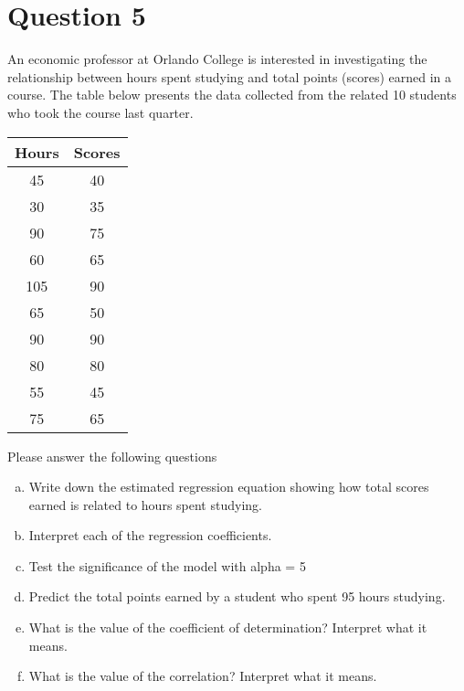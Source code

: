 \documentclass[
	11pt, %
]{assignment}
\begin{document}
\section*{Question 5}
\begin{problem}
An economic professor at Orlando College is interested in investigating the relationship between hours spent studying and total points (scores) earned in a course. The table below presents the data collected from the related 10 students who took the course last quarter.

\medskip

\begin{center}
	\begin{tabular}{c c}
		\toprule
		\textbf{Hours} & \textbf{Scores} \\
		\midrule
		45             & 40              \\
		30             & 35              \\
		90             & 75              \\
		60             & 65              \\
		105            & 90              \\
		65             & 50              \\
		90             & 90              \\
		80             & 80              \\
		55             & 45              \\
		75             & 65              \\
	\end{tabular}
\end{center}

\medskip

Please answer the following questions
\begin{enumerate}[a.]
	\item Write down the estimated regression equation showing how total scores earned is related to hours spent studying.
	\item Interpret each of the regression coefficients.
	\item Test the significance of the model with alpha = 5%
	\item Predict the total points earned by a student who spent 95 hours studying.
	\item What is the value of the coefficient of determination? Interpret what it means.
	\item What is the value of the correlation? Interpret what it means.
\end{enumerate}
\end{problem}
\end{document}
